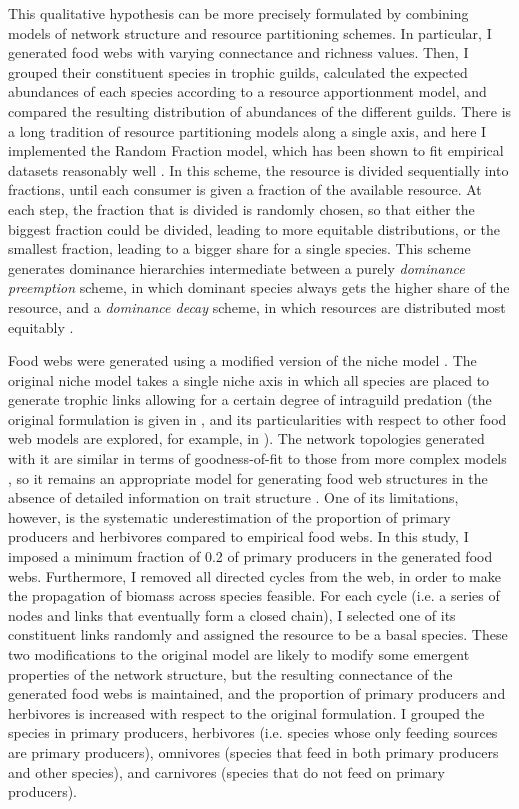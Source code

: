 This qualitative hypothesis can be more precisely formulated by combining models of network structure and resource partitioning schemes. In particular, I generated food webs with varying connectance and richness values. Then, I grouped their constituent species in trophic guilds, calculated the expected abundances of each species according to a resource apportionment model, and compared the resulting distribution of abundances of the different guilds. There is a long tradition of resource partitioning models along a single axis, and here I implemented the Random Fraction model, which has been shown to fit empirical datasets reasonably well \citep{Tokeshi1990}. In this scheme, the resource is divided sequentially into fractions, until each consumer is given a fraction of the available resource. At each step, the fraction that is divided is randomly chosen, so that either the biggest fraction could be divided, leading to more equitable distributions, or the smallest fraction, leading to a bigger share for a single species. This scheme generates dominance hierarchies intermediate between a purely \textit{dominance preemption} scheme, in which dominant species always gets the higher share of the resource, and a \textit{dominance decay} scheme, in which resources are distributed most equitably \citep{Tokeshi1990}.

Food webs were generated using a modified version of the niche model \citep{Williams2000}. The original niche model takes a single niche axis in which all species are placed to generate trophic links allowing for a certain degree of intraguild predation (the original formulation is given in \citealt{Williams2000}, and its particularities with respect to other food web models are explored, for example, in \citealt{Dunne2006}). The network topologies generated with it are similar in terms of goodness-of-fit to those from more complex models \citep{Williams2008}, so it remains an appropriate model for generating food web structures in the absence of detailed information on trait structure \citep{Gravel2016}. One of its limitations, however, is the systematic underestimation of the proportion of primary producers and herbivores compared to empirical food webs. In this study, I imposed a minimum fraction of 0.2 of primary producers in the generated food webs. Furthermore, I removed all directed cycles from the web, in order to make the propagation of biomass across species feasible. For each cycle (i.e. a series of nodes and links that eventually form a closed chain), I selected one of its constituent links randomly and assigned the resource to be a basal species. These two modifications to the original model are likely to modify some emergent properties of the network structure, but the resulting connectance of the generated food webs is maintained, and the proportion of primary producers and herbivores is increased with respect to the original formulation. I grouped the species in primary producers, herbivores (i.e. species whose only feeding sources are primary producers), omnivores (species that feed in both primary producers and other species), and carnivores (species that do not feed on primary producers).

